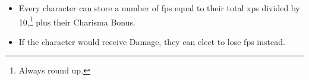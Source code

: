 \begin{itemize}
  \item
  Every character can store a number of \glspl{fp} equal to their total \glspl{xp} divided by 10,\footnote{Always round up.} plus their Charisma Bonus.
  \item
  If the character would receive Damage, they can elect to lose \glspl{fp} instead.
\end{itemize}
